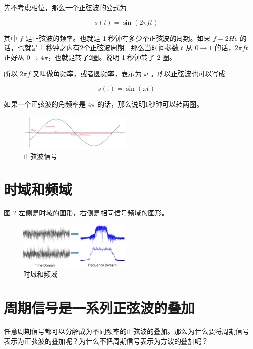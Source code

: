 \documentclass[lang=cn,newtx,10pt,scheme=chinese]{elegantbook}
\begin{document}
先不考虑相位，那么一个正弦波的公式为

$$
s(t) = \sin(2\pi ft)
$$

其中 $f$ 是正弦波的频率。也就是 1 秒钟有多少个正弦波的周期。如果 $f=2Hz$ 的话，也就是 1 秒钟之内有2个正弦波周期。那么当时间参数 $t$ 从 $0 \rightarrow 1$ 的话，$2\pi ft$正好从 $0 \rightarrow 4\pi$，也就是转了2圈。说明 1 秒钟转了 2 圈。

所以 $2\pi f$ 又叫做角频率，或者圆频率，表示为 $\omega$ 。所以正弦波也可以写成

$$
s(t) = \sin(\omega t)
$$

如果一个正弦波的角频率是 $4\pi$ 的话，那么说明1秒钟可以转两圈。

\begin{figure}[!htb]
\centering
\includegraphics[width=0.5\textwidth]{amplitude_phase_period.pdf}
\caption{正弦波信号}
\label{fig:amplitude_phase_period}
\end{figure}

\section{时域和频域}

图 \ref{fig:time_and_freq_domain_example_signals} 左侧是时域的图形，右侧是相同信号频域的图形。

\begin{figure}[!htb]
\centering
\includegraphics[width=0.5\textwidth]{time_and_freq_domain_example_signals.png}
\caption{时域和频域}
\label{fig:time_and_freq_domain_example_signals}
\end{figure}

\section{周期信号是一系列正弦波的叠加}

任意周期信号都可以分解成为不同频率的正弦波的叠加。那么为什么要将周期信号表示为正弦波的叠加呢？为什么不把周期信号表示为方波的叠加呢？
\end{document}

